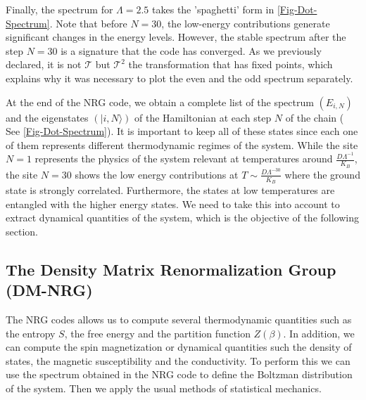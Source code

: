 Finally, the spectrum for $\Lambda = 2.5$ takes the 'spaghetti' form in \ref{Fig-Dot-Spectrum}.  Note that before $N=30$, the low-energy contributions generate significant changes in the energy levels.  However, the stable spectrum after the step $N=30$ is a signature that the code has converged. As we previously declared, it is not $\mathcal{T}$ but $\mathcal{T}^2$ the transformation that has fixed points, which explains why it was necessary to plot the even and the odd spectrum separately.



At the end of the NRG code, we obtain a complete list of the spectrum $(E_{i, N})$ and the eigenstates $(\vert i , N \rangle)$ of the Hamiltonian at each step $N$ of the chain ( See \ref{Fig-Dot-Spectrum}). It is important to keep all of these states since each one of them represents different thermodynamic regimes of the system. While the site $N=1$ represents the physics of the system relevant at temperatures around $\frac{D \Lambda^{-1}}{K_B }$, the site $N=30$ shows the low energy contributions at $T \sim \frac{D \Lambda^{-30}}{K_B }$ where the ground state is strongly correlated. Furthermore, the states at low temperatures are entangled with the higher energy states. We need to take this into account to extract dynamical quantities of the system, which is the objective of the following section. 

\subsection{The Density Matrix Renormalization Group (DM-NRG) \label{subsec:DM-NRG}}
The NRG codes allows us to compute several thermodynamic quantities such as the entropy $S$, the free energy and the partition function $Z(\beta)$. In addition, we can compute the spin magnetization or dynamical quantities such  the density of states, the magnetic susceptibility and the conductivity. To perform this we can use the spectrum obtained in the NRG code to define the Boltzman distribution of the system. Then we apply the usual methods of statistical mechanics.  

